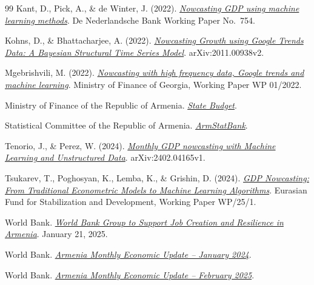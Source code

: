 \documentclass[12pt,a4paper]{report}
\begin{document}
\begin{thebibliography}{99}
Kant, D., Pick, A., \& de Winter, J. (2022).
\href{https://www.dnb.nl/media/kq4pe4cr/working_paper_no_754.pdf}{\textit{Nowcasting GDP using machine learning methods}}.
De Nederlandsche Bank Working Paper No.\ 754.

Kohns, D., \& Bhattacharjee, A. (2022).
\href{https://arxiv.org/abs/2011.00938}{\textit{Nowcasting Growth using Google Trends Data: A Bayesian Structural Time Series Model}}.
arXiv:2011.00938v2.

Mgebrishvili, M. (2022).
\href{https://drive.google.com/file/d/118GZO60e9TBU52rk-vnPM0KlXjtRH4S2/view?usp=sharing}{\textit{Nowcasting with high frequency data, Google trends and machine learning}}.
Ministry of Finance of Georgia, Working Paper WP 01/2022.

Ministry of Finance of the Republic of Armenia.
\href{https://www.minfin.am/en/page/budget/}{\textit{State Budget}}.

Statistical Committee of the Republic of Armenia.
\href{https://statbank.armstat.am/pxweb/en/ArmStatBank/}{\textit{ArmStatBank}}.

Tenorio, J., \& Perez, W. (2024).
\href{https://drive.google.com/file/d/1tIbCTI5vBiTK9OfBZ8C-3nT4Bnhuco1d/view?usp=sharing}{\textit{Monthly GDP nowcasting with Machine Learning and Unstructured Data}}.
arXiv:2402.04165v1.

Tsukarev, T., Poghosyan, K., Lemba, K., \& Grishin, D. (2024).
\href{https://efsd.org/upload/iblock/0f4/hwg0io77bdcni8o7z0qmqjlpu7zagtpo/GDP-NOWCASTING-FROM-TRADITIONAL-ECONOMETRIC-MODELS-TO-MACHINE-LEARNING-ALGORITHMS.pdf}{\textit{GDP Nowcasting: From Traditional Econometric Models to Machine Learning Algorithms}}.
Eurasian Fund for Stabilization and Development, Working Paper WP/25/1.

World Bank.
\href{https://www.worldbank.org/en/news/press-release/2025/01/21/world-bank-group-to-support-job-creation-and-resilience-in-armenia}{\textit{World Bank Group to Support Job Creation and Resilience in Armenia}}.
January 21, 2025.

World Bank.
\href{https://thedocs.worldbank.org/en/doc/6b97e748ad629581293fc77a1a9030d5-0080012024/original/ARM-MEU-JAN-2024-Eng.pdf}{\textit{Armenia Monthly Economic Update -- January 2024}}.

World Bank.
\href{https://thedocs.worldbank.org/en/doc/31d4fb42e3f938e12830d2f6339c17fa-0080062025/original/ARM-MEU-FEB-2025-en.pdf}{\textit{Armenia Monthly Economic Update -- February 2025}}.


\end{thebibliography}
\end{document}
